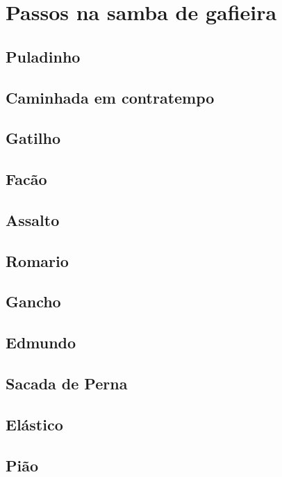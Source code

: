 

\chapter{Passos na samba de gafieira}

\section{Puladinho}

\section{Caminhada em contratempo}

\section{Gatilho}

\section{Facão}

\section{Assalto}

\section{Romario}

\section{Gancho}

\section{Edmundo}

\section{Sacada de Perna}

\section{Elástico}

\section{Pião}

